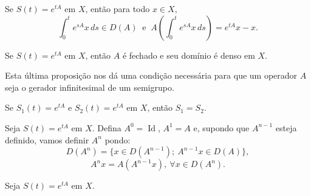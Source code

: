 \begin{frame}{ }
\begin{prop}
Se $S(t)=e^{tA}$ em $X$, então para todo $x\in X$, 
\[\int_0^t e^{sA}x\,ds\in D(A)\ \text{ e }\ A\left(\int_0^t e^{sA}x\,ds\right)=e^{tA}x-x.\]
\end{prop}

\begin{prop}
Se $S(t)=e^{tA}$ em $X$, então $A$ é fechado e seu domínio é denso em $X$.
\end{prop}

\begin{exampleblock}{}
Esta última proposição nos dá uma condição necessária para que um operador $A$ seja o gerador infinitesimal de um semigrupo.
\end{exampleblock}
\begin{prop}[Unicidade]
Se $S_1(t)=e^{tA}$ e $S_2(t)=e^{tA}$ em $X$, então $S_1=S_2$.
\end{prop}
\end{frame}


\begin{frame}{ }
\begin{defin}
Seja $S(t)=e^{tA}$ em $X$. Defina $A^0=\operatorname{Id}$, $A^1=A$ e, supondo que $A^{n-1}$ esteja definido, vamos definir $A^n$ pondo:
\[D(A^n)=\{x\in D(A^{n-1});\ A^{n-1}x\in D(A)\},\]
\[A^nx=A(A^{n-1}x), \ \forall x\in D(A^{n}).\]
\end{defin}
\end{frame}

\begin{frame}{ }
\begin{prop}
Seja $S(t)=e^{tA}$ em $X$. 
\end{prop}

\end{frame}